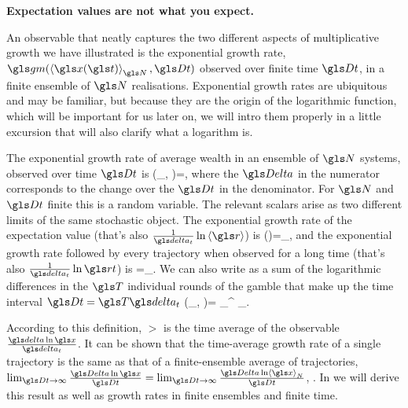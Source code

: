 \textbf{Expectation values are not what you expect.}

An observable that neatly captures the two different 
aspects of multiplicative growth we have illustrated is the exponential growth rate, $\gm(\ave{\x(\t)}_\N, \Dt)$ 
observed over finite time $\Dt$, in a finite ensemble
of $\N$ realisations. Exponential growth rates are ubiquitous and may be familiar, but because they are the origin of the logarithmic function, which will be important for us later on, we will intro them properly in a little excursion that will also clarify what a logarithm is.

The exponential growth rate of average wealth in an ensemble of $\N$ systems, observed over time $\Dt$ is
\be
\gm(\ave{\x(\t)}_\N, \Dt)=\frac{\D \ln \ave{\x}_\N}{\Dt},
\ee
where the $\D$ in the numerator corresponds to the change over the $\Dt$ in the denominator. For $\N$ and $\Dt$ finite this is a random variable. The relevant scalars arise as two different limits
of the same stochastic object. The exponential growth rate of the expectation value 
(that's also $\frac{1}{\dt} \ln \ave{\gr}$) is
\be
\gm(\ave{\x})=\lim_{\N\to\infty}\gm,
\ee
and the exponential growth rate followed by every trajectory when
observed for a long time (that's also $\frac{1}{\dt} \ln \rt$) is 
\be
\gt=\lim_{\Dt\to\infty}\gm.
\ee
We can also write  as a sum of the logarithmic differences in  the 
$\T$ individual rounds of the gamble that make up the time interval 
$\Dt=\T \dt$
\be
\gm(\ave{\x(\t)}_\N, \Dt)=  \sum_{}^{\T} \D\ln \ave{\x(\t+\gtau\dt)}_\N.
\ee

According to this definition, $\gt$ is the time average of 
the observable $\frac{\d \ln \x}{\dt}$. It can be shown that
the time-average growth rate of a single trajectory is the same as that
of a finite-ensemble average of trajectories,
$\lim_{\Dt\to\infty}\frac{\D \ln \x}{\Dt}=\lim_{\Dt\to\infty}\frac{\D \ln \ave{\x}_N}{\Dt}$, \cite{PetersKlein2013}. In  we will derive this result as well as growth rates in finite ensembles and finite time.

